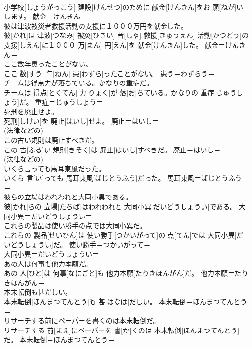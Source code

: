 \documentclass[8pt]{extreport}
\begin{document}
\begin{CJK}{UTF8}{min}
{\\	小学校[しょうがっこう] 建設[けんせつ]のために 献金[けんきん]をお 願[ねが]いします。	献金＝けんきん＝ 
\\	彼は津波被災者救援活動の支援に１０００万円を献金した。	
\\	彼[かれ]は 津波[つなみ] 被災[ひさい] 者[しゃ] 救援[きゅうえん] 活動[かつどう]の 支援[しえん]に１０００ 万[まん] 円[えん]を 献金[けんきん]した。	献金＝けんきん＝ 
\\	ここ数年患ったことがない。	
\\	ここ 数[すう] 年[ねん] 患[わずら]ったことがない。	患う＝わずらう＝ 
\\	チームは得点力が落ちている。かなりの重症だ。	
\\	チームは 得点[とくてん] 力[りょく]が 落[お]ちている。かなりの 重症[じゅうしょう]だ。	重症＝じゅうしょう＝ 
\\	死刑を廃止せよ。	
\\	死刑[しけい]を 廃止[はいし]せよ。	廃止＝はいし＝ 
\\	(法律などの) 
\\	この古い規則は廃止すべきだ。	
\\	この 古[ふる]い 規則[きそく]は 廃止[はいし]すべきだ。	廃止＝はいし＝ 
\\	(法律などの) 
\\	いくら言っても馬耳東風だった。	
\\	いくら 言[い]っても 馬耳東風[ばじとうふう]だった。	馬耳東風＝ばじとうふう＝ 
\\	彼らの立場はわれわれと大同小異である。	
\\	彼[かれ]らの 立場[たちば]はわれわれと 大同小異[だいどうしょうい]である。	大同小異＝だいどうしょうい＝ 
\\	これらの製品は使い勝手の点では大同小異だ。	
\\	これらの 製品[せいひん]は 使い勝手[つかいがって]の 点[てん]では 大同小異[だいどうしょうい]だ。	使い勝手＝つかいがって＝ 
\\	大同小異＝だいどうしょうい＝ 
\\	あの人は何事も他力本願だ。	
\\	あの 人[ひと]は 何事[なにごと]も 他力本願[たりきほんがん]だ。	他力本願＝たりきほんがん＝ 
\\	本末転倒も甚だしい。	
\\	本末転倒[ほんまつてんとう]も 甚[はなは]だしい。	本末転倒＝ほんまつてんとう＝ 
\\	リサーチする前にペーパーを書くのは本末転倒だ。	
\\	リサーチする 前[まえ]にペーパーを 書[か]くのは 本末転倒[ほんまつてんとう]だ。	本末転倒＝ほんまつてんとう＝ 
}
\end{CJK}
\end{document}
